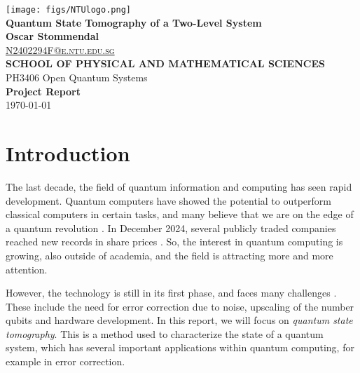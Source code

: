 \documentclass[a4paper,12pt]{article}
\begin{document}
\begin{titlepage}
    \begin{center}
        \texttt{[image: figs/NTUlogo.png]} 
        \\[2cm]
        
        {\huge \textbf{Quantum State Tomography of a Two-Level System}} 
        \\[2cm]
        
        {\large \textbf{Oscar Stommendal}} 
        \\[0.2cm]
        
        {\large \href{mailto:N2402294F@e.ntu.edu.sg}{\textsc{N2402294F@e.ntu.edu.sg}}}
        \\[2cm]
        
        {\textbf{SCHOOL OF PHYSICAL AND MATHEMATICAL SCIENCES}} 
        \\[2cm]
        
        {\Large PH3406 Open Quantum Systems} 
        \\[0.5cm]
        
        {\Large \textbf{Project Report}} 
        \\[2cm]

        \vfill
        {\Large \today}
    \end{center}
\end{titlepage}

\section{Introduction}
The last decade, the field of quantum information and computing has seen rapid development. Quantum computers have showed the potential to outperform classical computers in certain tasks, and many believe that we are on the edge of a quantum revolution \cite{outperform} \cite{revolution}. In December 2024, several publicly traded companies reached new records in share prices \cite{rocket}. So, the interest in quantum computing is growing, also outside of academia, and the field is attracting more and more attention. 

However, the technology is still in its first phase, and faces many challenges \cite{challenge}. These include the need for error correction due to noise, upscaling of the number qubits and hardware development. In this report, we will focus on \textit{quantum state tomography}. This is a method used to characterize the state of a quantum system, which has several important applications within quantum computing, for example in error correction.
\end{document}
